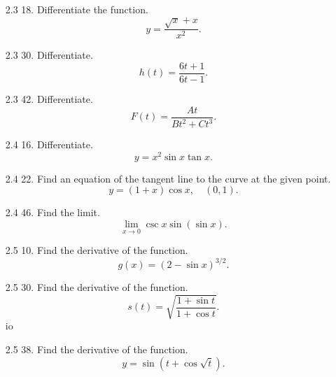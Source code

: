 \documentclass[letterpaper,11pt]{article}
\begin{document}
\begin{enumerate}
    \item[2.3 18.] Differentiate the function.
    \[y = \frac{\sqrt{x}+x}{x^2}.\]
    \vfill
    \item[2.3 30.] Differentiate.
    \[h(t) = \frac{6t+1}{6t-1}.\]
    \vfill
    \item[2.3 42.] Differentiate.
    \[F(t) = \frac{At}{Bt^2+Ct^3}.\]
    \vfill 
    \newpage
    \item[2.4 16.] Differentiate.
    \[y = x^2\sin{x}\tan{x}.\]
    \vfill
    \item[2.4 22.] Find an equation of the tangent line to the curve at the given point.
    \[y = (1+x)\cos{x}, \quad (0,1).\]
    \vfill 
    \item[2.4 46.] Find the limit.
    \[\lim_{x\to 0} \csc{x}\sin(\sin{x}).\]
    \vfill
    \newpage
    \item[2.5 10.] Find the derivative of the function.
    \[g(x) = (2-\sin{x})^{3/2}.\]
    \vfill
    \item[2.5 30.] Find the derivative of the function.
    \[s(t) = \sqrt{\frac{1+\sin{t}}{1+\cos{t}}}.\]io
    \vfill
    \item[2.5 38.] Find the derivative of the function.
    \[y = \sin(t+\cos{\sqrt{t}}).\]
    \vfill
\end{enumerate}
\end{document}
